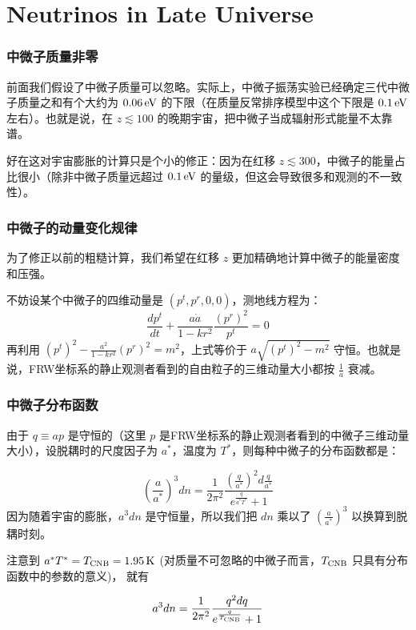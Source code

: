 \documentclass[CJK,13pt]{beamer}
\begin{document}
  
  \section{Neutrinos in Late Universe}

  \begin{frame}
    \frametitle{中微子质量非零}
    前面我们假设了中微子质量可以忽略。实际上，中微子振荡实验已经确定三代中微子质量之和有个大约为 $0.06\,\mathrm{eV}$ 的下限（在质量反常排序模型中这个下限是 $0.1\,\mathrm{eV}$ 左右）。也就是说，在 $z\lesssim 100$ 的晚期宇宙，把中微子当成辐射形式能量不太靠谱。

    \skipline

    好在这对宇宙膨胀的计算只是个小的修正：因为在红移 $z\lesssim 300$，中微子的能量占比很小（除非中微子质量远超过 $0.1\,\mathrm{eV}$ 的量级，但这会导致很多和观测的不一致性）。
  \end{frame}
  


  \begin{frame}
    \frametitle{中微子的动量变化规律}
    为了修正以前的粗糙计算，我们希望在红移 $z$ 更加精确地计算中微子的能量密度和压强。

    \skipline
    
    不妨设某个中微子的四维动量是 $(p^t, p^r, 0, 0)$，测地线方程为：
    $$ \frac{dp^t}{dt} + \frac{a\dot a}{1-kr^2}\frac{(p^r)^2}{p^t} =0 $$
    再利用 $(p^t)^2 - \frac{a^2}{1-kr^2}(p^r)^2 = m^2$，上式等价于
    $ a\sqrt{(p^t)^2-m^2}$ 守恒。也就是说，{\blue FRW坐标系的静止观测者看到的自由粒子的三维动量大小都按 $\frac{1}{a}$ 衰减}。
  \end{frame}


  \begin{frame}
    \frametitle{中微子分布函数}
    由于 $q\equiv ap$ 是守恒的（这里 $p$ 是FRW坐标系的静止观测者看到的中微子三维动量大小），设脱耦时的尺度因子为 $a^*$，温度为 $T^*$，则每种中微子的分布函数都是：

    $$\left(\frac{a}{a^*}\right)^3dn = \frac{1}{2\pi^2}\frac{\left(\frac{q}{a^*}\right)^2d\frac{q}{a^*}}{e^{\frac{q}{a^*T^*}}+1}$$
    因为随着宇宙的膨胀，$a^3dn$ 是守恒量，所以我们把 $dn$ 乘以了 $\left(\frac{a}{a^*}\right)^3$ 以换算到脱耦时刻。

    注意到 $a^*T^* = T_{\rm CNB}=1.95\,\mathrm{K}$ (对质量不可忽略的中微子而言，$T_{\rm CNB}$ 只具有分布函数中的参数的意义)， 就有

    $$ a^3dn = \frac{1}{2\pi^2}\frac{q^2dq}{e^{\frac{q}{T_{\rm CNB}}}+1}$$

  \end{frame}
  
\end{document}
